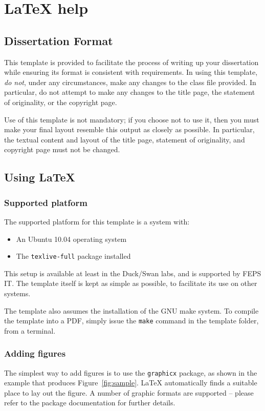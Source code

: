 
\chapter{LaTeX help}

\section{Dissertation Format}
This template is provided to facilitate the process of writing up your
dissertation while ensuring its format is consistent with requirements.
In using this template, \emph{do not}, under any circumstances, make any
changes to the class file provided.
In particular, do not attempt to make any changes to the title page, the
statement of originality, or the copyright page.

Use of this template is not mandatory; if you choose not to use it, then you
must make your final layout resemble this output as closely as possible.
In particular, the textual content and layout of the title page, statement of
originality, and copyright page must not be changed.

\section{Using \LaTeX{}}

\subsection{Supported platform}
The supported platform for this template is a system with:
\begin{itemize}
\item An Ubuntu 10.04 operating system
\item The \verb|texlive-full| package installed
\end{itemize}
This setup is available at least in the Duck/Swan labs, and is supported by
FEPS IT.
The template itself is kept as simple as possible, to facilitate its use on
other systems.

The template also assumes the installation of the GNU make system.
To compile the template into a PDF, simply issue the \verb|make| command
in the template folder, from a terminal.

\subsection{Adding figures}
The simplest way to add figures is to use the \verb|graphicx| package, as shown
in the example that produces Figure~\ref{fig:sample}.
\LaTeX{} automatically finds a suitable place to lay out the figure.
A number of graphic formats are supported -- please refer to the package
documentation for further details.


